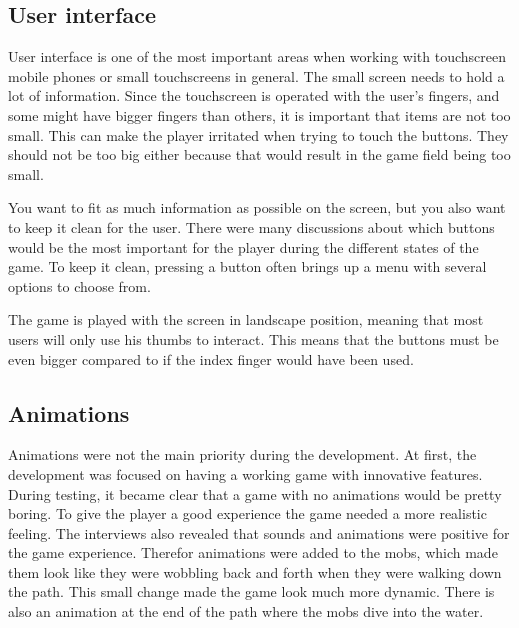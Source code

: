 \subsection{User interface}

User interface is one of the most important areas when working with touchscreen mobile phones or small touchscreens in general. The small screen needs to hold a lot of information. Since the touchscreen is operated with the user's fingers, and some might have bigger fingers than others, it is important that items are not too small. This can make the player irritated when trying to touch the buttons. They should not be too big either because that would result in the game field being too small.

You want to fit as much information as possible on the screen, but you also want to keep it clean for the user. There were many discussions about which buttons would be the most important for the player during the different states of the game. To keep it clean, pressing a button often brings up a menu with several options to choose from.

The game is played with the screen in landscape position, meaning that most users will only use his thumbs to interact. This means that the buttons must be even bigger compared to if the index finger would have been used.
\subsection{Animations}

Animations were not the main priority during the development. At first, the development was focused on having a working game with innovative features. During testing, it became clear that a game with no animations would be pretty boring. To give the player a good experience the game needed a more realistic feeling. The interviews also revealed that sounds and animations were positive for the game experience. Therefor animations were added to the mobs, which made them look like they were wobbling back and forth when they were walking down the path. This small change made the game look much more dynamic. There is also an animation at the end of the path where the mobs dive into the water. 
